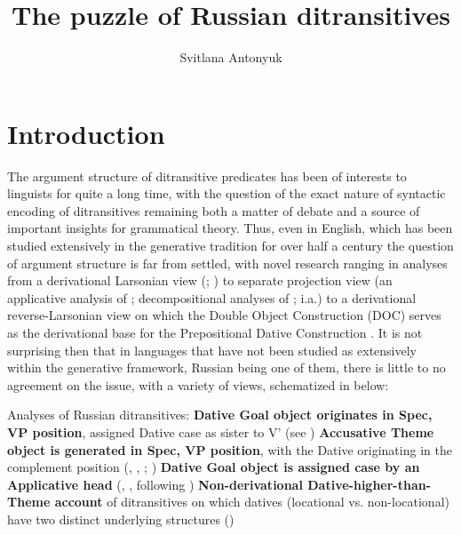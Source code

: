 \documentclass[output=paper,colorlinks,citecolor=brown,nonflat]{./langscibook}
\author{Svitlana Antonyuk	\affiliation{University of Connecticut}}
\title{The puzzle of Russian ditransitives}
\begin{document}
\maketitle





\section{Introduction}\label{sec:antonyuk:1}

The argument structure of ditransitive predicates has been of interests to linguists for quite a long time, with the question of the exact nature of syntactic encoding of ditransitives remaining both a matter of debate and a source of important insights for grammatical theory. Thus, even in English, which has been studied extensively in the generative tradition for over half a century the question of argument structure is far from settled, with novel research ranging in analyses from a derivational Larsonian view (\citealt{Larson1988}; \citeyear{Larson2014}) to separate projection view (an applicative analysis of \citealt{Marantz1993}; decompositional analyses of \citealt{Pesetsky1995, Harley1995Diss}; \citeyear{Harley2002} i.a.) to a derivational reverse-Larsonian view on which the Double Object Construction (DOC) serves as the derivational base for the Prepositional Dative Construction \citep{Hallman2015}. It is not surprising then that in languages that have not been studied as extensively within the generative framework, Russian being one of them, there is little to no agreement on the issue, with a variety of views, schematized in  below:

\ea%
    \label{ex:antonyuk:1}
    Analyses of Russian ditransitives:
    \ea \textbf{Dative Goal object originates in Spec, VP position}, assigned Dative case as sister to V’ (see \citealt{HarbertToribio1991, GreenbergFranks1991, Franks1995, Richardson2007})
    \ex \textbf{Accusative Theme object is generated in Spec, VP position}, with the Dative originating in the complement position (\citealt{Bailyn1995}, \citeyear{Bailyn2010}, \citeyear{Bailyn2012}; \citealt{Titov2017})
    \ex \textbf{Dative Goal object is assigned case by an Applicative head} (\citealt{Dyakonova2005}, \citeyear{Dyakonova2009}, following \citealt{Pylkkänen2002})
    \ex \textbf{Non-derivational Dative-higher-than-Theme account} of ditransitives on which datives (locational vs. non-locational) have two distinct underlying structures (\citealt{BonehNash2017})
    \z
\z
\end{document}
